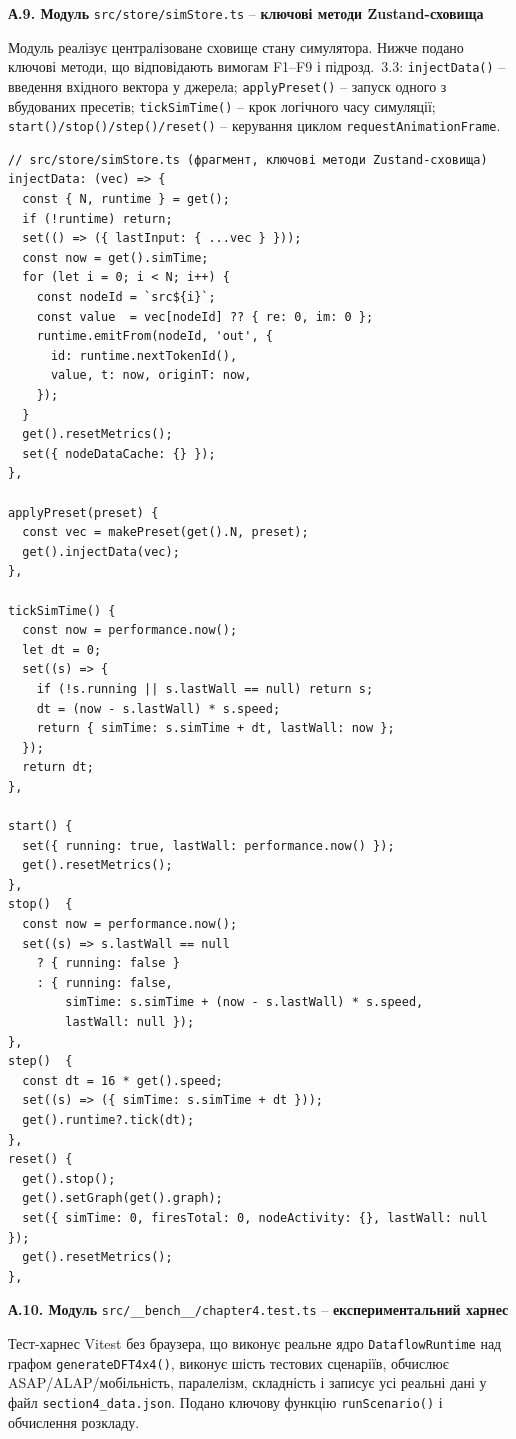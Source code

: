 \documentclass[
]{article}
\begin{document}
\textbf{А.9. Модуль} \texttt{src/store/simStore.ts} --
\textbf{ключові методи Zustand-сховища}

Модуль реалізує централізоване сховище стану симулятора. Нижче подано
ключові методи, що відповідають вимогам F1--F9 і підрозд.~3.3:
\texttt{injectData()} -- введення вхідного вектора у джерела;
\texttt{applyPreset()} -- запуск одного з вбудованих пресетів;
\texttt{tickSimTime()} -- крок логічного часу симуляції;
\texttt{start()/stop()/step()/reset()} -- керування циклом
\texttt{requestAnimationFrame}.

\begin{verbatim}
// src/store/simStore.ts (фрагмент, ключові методи Zustand-сховища)
injectData: (vec) => {
  const { N, runtime } = get();
  if (!runtime) return;
  set(() => ({ lastInput: { ...vec } }));
  const now = get().simTime;
  for (let i = 0; i < N; i++) {
    const nodeId = `src${i}`;
    const value  = vec[nodeId] ?? { re: 0, im: 0 };
    runtime.emitFrom(nodeId, 'out', {
      id: runtime.nextTokenId(),
      value, t: now, originT: now,
    });
  }
  get().resetMetrics();
  set({ nodeDataCache: {} });
},

applyPreset(preset) {
  const vec = makePreset(get().N, preset);
  get().injectData(vec);
},

tickSimTime() {
  const now = performance.now();
  let dt = 0;
  set((s) => {
    if (!s.running || s.lastWall == null) return s;
    dt = (now - s.lastWall) * s.speed;
    return { simTime: s.simTime + dt, lastWall: now };
  });
  return dt;
},

start() {
  set({ running: true, lastWall: performance.now() });
  get().resetMetrics();
},
stop()  {
  const now = performance.now();
  set((s) => s.lastWall == null
    ? { running: false }
    : { running: false,
        simTime: s.simTime + (now - s.lastWall) * s.speed,
        lastWall: null });
},
step()  {
  const dt = 16 * get().speed;
  set((s) => ({ simTime: s.simTime + dt }));
  get().runtime?.tick(dt);
},
reset() {
  get().stop();
  get().setGraph(get().graph);
  set({ simTime: 0, firesTotal: 0, nodeActivity: {}, lastWall: null });
  get().resetMetrics();
},
\end{verbatim}

\textbf{А.10. Модуль} \texttt{src/\_\_bench\_\_/chapter4.test.ts} --
\textbf{експериментальний харнес}

Тест-харнес Vitest без браузера, що виконує реальне ядро
\texttt{DataflowRuntime} над графом
\texttt{generateDFT4x4()}, виконує шість тестових сценаріїв, обчислює
ASAP/ALAP/мобільність, паралелізм, складність і записує усі реальні
дані у файл \texttt{section4\_data.json}. Подано ключову функцію
\texttt{runScenario()} і обчислення розкладу.
\end{document}

